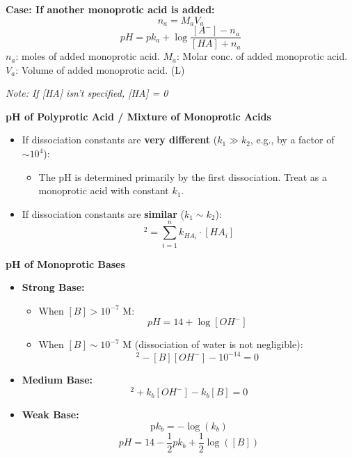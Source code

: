 \textbf{Case: If another monoprotic acid is added:}
\begin{equation}
n_a = M_aV_a
\end{equation}
\begin{equation}
pH = pk_a + \log \frac{[A^-] - n_{a}}{[HA] + n_{a}}
\end{equation}
\textbf{$n_{a}$}: moles of added monoprotic acid.
\textbf{$M_{a}$}: Molar conc. of added monoprotic acid.
\textbf{$V_{a}$}: Volume of added monoprotic acid. (L)

\textit{Note: If [HA] isn't specified, [HA] = 0}
\vspace{5mm}

\textbf{pH of Polyprotic Acid / Mixture of Monoprotic Acids}
\begin{itemize}
    \item If dissociation constants are \textbf{very different} (\( k_1 \gg k_2 \), e.g., by a factor of \( \sim 10^4 \)):
    \begin{itemize}
        \item The pH is determined primarily by the first dissociation. Treat as a monoprotic acid with constant \( k_1 \).
    \end{itemize}
    \item If dissociation constants are \textbf{similar} (\( k_1 \sim k_2 \)):
    \begin{equation}
    [H^+]^2 = \sum_{i=1}^{n} k_{HA_i} \cdot [HA_i]
    \end{equation}
\end{itemize}

\vspace{5mm}

\textbf{pH of Monoprotic Bases}
\begin{itemize}
    \item \textbf{Strong Base:}
    \begin{itemize}
        \item When \( [B] > 10^{-7} \) M:
        \begin{equation}
        pH = 14 + \log[OH^-]
        \end{equation}
        \item When \( [B] \sim 10^{-7} \) M (dissociation of water is not negligible):
        \begin{equation}
        [OH^-]^2 - [B][OH^-] - 10^{-14} = 0
        \end{equation}
    \end{itemize}
    \item \textbf{Medium Base:}
    \begin{equation}
    [OH^-]^2 + k_b[OH^-] - k_b[B] = 0
    \end{equation}
    \item \textbf{Weak Base:}
    \begin{equation}
    \text{p}k_b = -\log(k_b)
    \end{equation}
    \begin{equation}
    pH = 14 - \frac{1}{2} pk_b + \frac{1}{2} \log([B])
    \end{equation}
\end{itemize}

